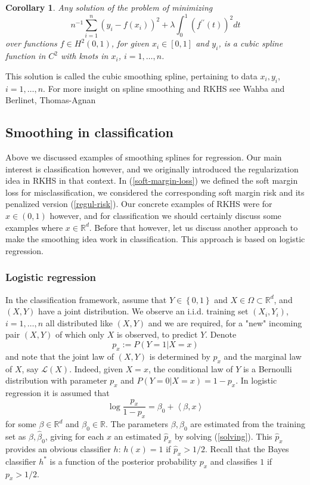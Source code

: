 \documentclass[11pt,twoside]{article}%
\theoremstyle{change}
\newtheorem{corollary}[theorem]{Corollary}
\begin{document}
\begin{corollary}
Any solution of the problem of minimizing
\[
n^{-1}\sum_{i=1}^{n}(y_{i}-f(x_{i}))^{2}+\lambda\int_{0}^{1}\left(
f^{\prime\prime}(t)\right)  ^{2}dt
\]
over functions $f\in H^{2}(0,1)$, for given $x_{i}\in\left[  0,1\right]  $ and
$y_{i}$, is a cubic spline function in $C^{2}$ with knots in $x_{i}$,
$i=1,\ldots,n$.
\end{corollary}

This solution is called the cubic smoothing spline, pertaining to data
$x_{i},y_{i}$, $i=1,\ldots,n$. For more insight on spline smoothing and RKHS
see Wahba \cite{Wah} and Berlinet, Thomas-Agnan \cite{BTA}

\subsection{Smoothing in classification}

Above we discussed examples of smoothing splines for regression. Our main
interest is classification however, and we originally introduced the
regularization idea in RKHS in that context. In (\ref{soft-margin-loss}) we
defined the soft margin loss for misclassification, we considered the
corresponding soft margin risk and its penalized version (\ref{regul-risk}).
Our concrete examples of RKHS were for $x\in(0,1)$ however, and for
classification we should certainly discuss some examples where $x\in
\mathbb{R}^{d}$. Before that however, let us discuss another approach to make
the smoothing idea work in classification. This approach is based on logistic regression.

\subsubsection{ Logistic regression}

In the classification framework, assume that $Y\in\left\{  0,1\right\}  $ and
$X\in\Omega\subset\mathbb{R}^{d}$, and $\left(  X,Y\right)  $ have a joint
distribution. We observe an i.i.d. training set $\left(  X_{i},Y_{i}\right)
$, $i=1,\ldots,n$ all distributed like $\left(  X,Y\right)  $ and we are
required, for a "new" incoming pair $\left(  X,Y\right)  $ of which only $X$
is observed, to predict $Y$. Denote
\[
p_{x}:=P\left(  Y=1|X=x\right)
\]
and note that the joint law of $\left(  X,Y\right)  $ is determined by $p_{x}$
and the marginal law of $X$, say $\mathcal{L}(X)$. Indeed, given $X=x$, the
conditional law of $Y$ is a Bernoulli distribution with parameter $p_{x}$ and
$P\left(  Y=0|X=x\right)  =1-p_{x}$. In logistic regression it is assumed
that
\begin{equation}
\log\frac{p_{x}}{1-p_{x}}=\beta_{0}+\left\langle \beta,x\right\rangle
\label{solving}%
\end{equation}
for some $\beta\in\mathbb{R}^{d}$ and $\beta_{0}\in\mathbb{R}$. The parameters
$\beta,\beta_{0}$ are estimated from the training set as $\hat{\beta}%
,\hat{\beta}_{0}$, giving for each $x$ an estimated $\hat{p}_{x}$ by solving
(\ref{solving}). This $\hat{p}_{x}$ provides an obvious classifier $h $:
$h(x)=1$ if $\hat{p}_{x}>1/2$. Recall that the Bayes classifier $h^{\ast} $ is
a function of the posterior probability $p_{x}$ and classifies $1$ if
$p_{x}>1/2$.
\end{document}
